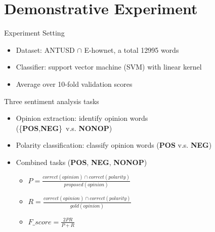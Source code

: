 \documentclass[compress]{beamer}
\begin{document}
\section{Demonstrative Experiment}
    \begin{frame}{\secname}
        \begin{block}{Experiment Setting}
            \begin{itemize}
                \item Dataset: ANTUSD $\cap$ E-hownet, a total 12995 words
                \item Classifier: support vector machine (SVM) with linear kernel
                \item Average over 10-fold validation scores
            \end{itemize}
        \end{block}
        \pause
        \begin{block}{Three sentiment analysis tasks}
            \begin{itemize}
                \item Opinion extraction: identify opinion words \\ (\{\textbf{POS},\textbf{NEG}\}\ v.s. \textbf{NONOP})
                \item Polarity classification: classify opinion words (\textbf{POS} v.s. \textbf{NEG})
                \item Combined tasks (\textbf{POS}, \textbf{NEG}, \textbf{NONOP})
                \begin{itemize}
                    \item $P=\frac{correct(opinion) \cap correct(polarity)}{proposed(opinion)}$
                    \item $R=\frac{correct(opinion) \cap correct(polarity)}{gold(opinion)}$
                    \item $F\_score = \frac{2PR}{P+R}$
                \end{itemize}
            \end{itemize}
        \end{block}
    \end{frame}
\end{document}
